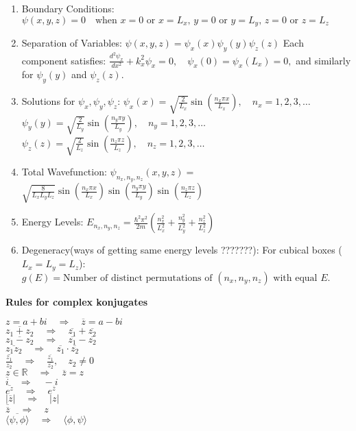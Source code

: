 \documentclass[a4paper,11pt]{article}
\renewcommand{\textbf}[1]{{\scriptsize	\bfseries #1}}
\begin{document}
\begin{footnotesize}
\begin{multicols}{2}
\begin{minipage}{\linewidth}
\begin{enumerate}
\item Boundary Conditions:
\(\psi(x, y, z) = 0 \quad \text{when } x = 0 \text{ or } x = L_x, \, y = 0 \text{ or } y = L_y, \, z = 0 \text{ or } z = L_z\)
\item Separation of Variables:
\(
\psi(x, y, z) = \psi_x(x) \psi_y(y) \psi_z(z)
\)
Each component satisfies:
\(
\frac{d^2 \psi_x}{dx^2} + k_x^2 \psi_x = 0, \quad \psi_x(0) = \psi_x(L_x) = 0,
\)
and similarly for \(\psi_y(y)\) and \(\psi_z(z)\).
\item  Solutions for \(\psi_x, \psi_y, \psi_z\):
\(
\psi_x(x) = \sqrt{\frac{2}{L_x}} \sin\left(\frac{n_x \pi x}{L_x}\right), \quad n_x = 1, 2, 3, \dots
\)
\(
\psi_y(y) = \sqrt{\frac{2}{L_y}} \sin\left(\frac{n_y \pi y}{L_y}\right), \quad n_y = 1, 2, 3, \dots
\)
\(
\psi_z(z) = \sqrt{\frac{2}{L_z}} \sin\left(\frac{n_z \pi z}{L_z}\right), \quad n_z = 1, 2, 3, \dots
\)
\item  Total Wavefunction:
\(\psi_{n_x, n_y, n_z}(x, y, z) = \)\(\sqrt{\frac{8}{L_x L_y L_z}} 
\sin\left(\frac{n_x \pi x}{L_x}\right)
\sin\left(\frac{n_y \pi y}{L_y}\right)
\sin\left(\frac{n_z \pi z}{L_z}\right)\)
\item  Energy Levels:
\(
E_{n_x, n_y, n_z} = \frac{\hbar^2 \pi^2}{2m} 
\left(\frac{n_x^2}{L_x^2} + \frac{n_y^2}{L_y^2} + \frac{n_z^2}{L_z^2}\right)
\)
\item Degeneracy(ways of getting same energy levels ???????):
For cubical boxes (\(L_x = L_y = L_z\)):
\(g(E) = \text{Number of distinct permutations of } (n_x, n_y, n_z) \text{ with equal } E.\)
\end{enumerate}


\end{minipage}
\begin{minipage}{\linewidth}

\textbf{Rules for complex konjugates}

\( z = a + bi \quad \Rightarrow \quad \overline{z} = a - bi \)\\
\( \overline{z_1 + z_2} \quad \Rightarrow \quad \overline{z_1} + \overline{z_2} \)\\
\( \overline{z_1 - z_2} \quad \Rightarrow \quad \overline{z_1} - \overline{z_2} \)\\
\( \overline{z_1 z_2} \quad \Rightarrow \quad \overline{z_1} \cdot \overline{z_2} \)\\
\( \overline{\frac{z_1}{z_2}} \quad \Rightarrow \quad \frac{\overline{z_1}}{\overline{z_2}}, \quad z_2 \neq 0 \)\\
\( z \in \mathbb{R} \quad \Rightarrow \quad \overline{z} = z \)\\
\( \overline{i} \quad \Rightarrow \quad -i \)\\
\( \overline{e^z} \quad \Rightarrow \quad e^{\overline{z}} \)\\
\( |\overline{z}| \quad \Rightarrow \quad |z| \)\\
\( \overline{\overline{z}} \quad \Rightarrow \quad z \)\\
\( \overline{\langle \psi, \phi \rangle} \quad \Rightarrow \quad \langle \phi, \psi \rangle \)\\



\end{minipage}
\end{multicols}
\end{footnotesize}
\end{document}
